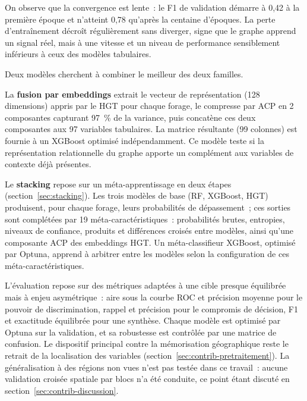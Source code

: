 On observe que la convergence est lente~: le F1 de validation d\'emarre \`a 0,42 \`a la premi\`ere \'epoque et n'atteint 0,78 qu'apr\`es la centaine d'\'epoques. La perte d'entra\^inement d\'ecro\^it r\'eguli\`erement sans diverger, signe que le graphe apprend un signal r\'eel, mais \`a une vitesse et un niveau de performance sensiblement inf\'erieurs \`a ceux des mod\`eles tabulaires.

\label{sec:contrib-hybrides}

Deux mod\`eles cherchent \`a combiner le meilleur des deux familles.

La \textbf{fusion par embeddings} extrait le vecteur de repr\'esentation (128 dimensions) appris par le HGT pour chaque forage, le compresse par ACP en 2 composantes capturant 97~\% de la variance, puis concat\`ene ces deux composantes aux 97 variables tabulaires. La matrice r\'esultante (99 colonnes) est fournie \`a un XGBoost optimis\'e ind\'ependamment. Ce mod\`ele teste si la repr\'esentation relationnelle du graphe apporte un compl\'ement aux variables de contexte d\'ej\`a pr\'esentes.

Le \textbf{stacking} repose sur un m\'eta-apprentissage en deux \'etapes (section~\ref{sec:stacking}). Les trois mod\`eles de base (RF, XGBoost, HGT) produisent, pour chaque forage, leurs probabilit\'es de d\'epassement~; ces sorties sont compl\'et\'ees par 19 m\'eta-caract\'eristiques~: probabilit\'es brutes, entropies, niveaux de confiance, produits et diff\'erences crois\'es entre mod\`eles, ainsi qu'une composante ACP des embeddings HGT. Un m\'eta-classifieur XGBoost, optimis\'e par Optuna, apprend \`a arbitrer entre les mod\`eles selon la configuration de ces m\'eta-caract\'eristiques.

\label{sec:contrib-protocole}

L'\'evaluation repose sur des m\'etriques adapt\'ees \`a une cible presque \'equilibr\'ee mais \`a enjeu asym\'etrique~: aire sous la courbe ROC et pr\'ecision moyenne pour le pouvoir de discrimination, rappel et pr\'ecision pour le compromis de d\'ecision, F1 et exactitude \'equilibr\'ee pour une synth\`ese. Chaque mod\`ele est optimis\'e par Optuna sur la validation, et sa robustesse est contr\^ol\'ee par une matrice de confusion. Le dispositif principal contre la m\'emorisation g\'eographique reste le retrait de la localisation des variables (section~\ref{sec:contrib-pretraitement}). La g\'en\'eralisation \`a des r\'egions non vues n'est pas test\'ee dans ce travail~: aucune validation crois\'ee spatiale par blocs n'a \'et\'e conduite, ce point \'etant discut\'e en section~\ref{sec:contrib-discussion}.


